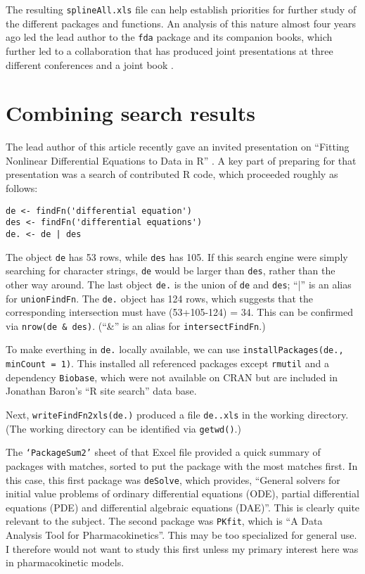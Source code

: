 The resulting {\tt splineAll.xls} file can help establish priorities
for further study of the different packages and functions.  An
analysis of this nature almost four years ago led the lead author
to the {\tt fda} package and its companion books, which further
led to a collaboration that has produced joint presentations at
three different conferences and a joint book \citep{RHG09}.


\section{Combining search results}

The lead author of this article recently gave an invited presentation
on ``Fitting Nonlinear Differential Equations to Data in R'' \citep{GHR09}.
A key part of preparing for that presentation was a search of
contributed R code, which proceeded roughly as follows:

\begin{verbatim}
de <- findFn('differential equation')
des <- findFn('differential equations')
de. <- de | des
\end{verbatim}

The object {\tt de} has 53 rows, while {\tt des} has 105.
If this search engine were simply searching for character
strings, {\tt de} would be larger than {\tt des}, rather than
the other way around.  The last object {\tt de.} is the union
of {\tt de} and {\tt des};  ``|'' is an alias for {\tt unionFindFn}.
The {\tt de.} object has 124 rows, which suggests that
the corresponding intersection must have (53+105-124) = 34.
This can be confirmed via {\tt nrow(de \& des)}.
(``\&'' is an alias for {\tt intersectFindFn}.)

To make everthing in {\tt de.} locally available, we can use
{\tt installPackages(de., minCount = 1)}.  This installed all
referenced packages except {\tt rmutil} and a dependency {\tt Biobase},
which were not available on CRAN but are included in Jonathan
Baron's ``R site search'' data base.

Next, {\tt writeFindFn2xls(de.)} produced a file {\tt de..xls}
in the working directory.  (The working directory can be
identified via {\tt getwd()}.)

The {\tt `PackageSum2'} sheet of that Excel file provided a quick
summary of packages with matches, sorted to put the package
with the most matches first.  In this case, this first package
was {\tt deSolve}, which provides, ``General solvers for initial
value problems of ordinary differential equations (ODE),
partial differential equations (PDE) and differential
algebraic equations (DAE)''.  This is clearly quite relevant
to the subject.  The second package was {\tt PKfit}, which
is ``A Data Analysis Tool for Pharmacokinetics''.  This may
be too specialized for general use.  I therefore would not
want to study this first unless my primary interest here was in
pharmacokinetic models.

